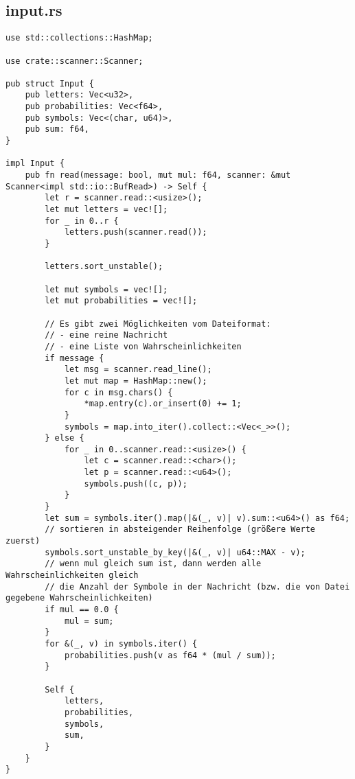 \subsection{input.rs}
\begin{lstlisting}
use std::collections::HashMap;

use crate::scanner::Scanner;

pub struct Input {
    pub letters: Vec<u32>,
    pub probabilities: Vec<f64>,
    pub symbols: Vec<(char, u64)>,
    pub sum: f64,
}

impl Input {
    pub fn read(message: bool, mut mul: f64, scanner: &mut Scanner<impl std::io::BufRead>) -> Self {
        let r = scanner.read::<usize>();
        let mut letters = vec![];
        for _ in 0..r {
            letters.push(scanner.read());
        }

        letters.sort_unstable();

        let mut symbols = vec![];
        let mut probabilities = vec![];

        // Es gibt zwei Möglichkeiten vom Dateiformat:
        // - eine reine Nachricht
        // - eine Liste von Wahrscheinlichkeiten
        if message {
            let msg = scanner.read_line();
            let mut map = HashMap::new();
            for c in msg.chars() {
                *map.entry(c).or_insert(0) += 1;
            }
            symbols = map.into_iter().collect::<Vec<_>>();
        } else {
            for _ in 0..scanner.read::<usize>() {
                let c = scanner.read::<char>();
                let p = scanner.read::<u64>();
                symbols.push((c, p));
            }
        }
        let sum = symbols.iter().map(|&(_, v)| v).sum::<u64>() as f64;
        // sortieren in absteigender Reihenfolge (größere Werte zuerst)
        symbols.sort_unstable_by_key(|&(_, v)| u64::MAX - v);
        // wenn mul gleich sum ist, dann werden alle Wahrscheinlichkeiten gleich 
        // die Anzahl der Symbole in der Nachricht (bzw. die von Datei gegebene Wahrscheinlichkeiten)
        if mul == 0.0 {
            mul = sum;
        }
        for &(_, v) in symbols.iter() {
            probabilities.push(v as f64 * (mul / sum));
        }

        Self {
            letters,
            probabilities,
            symbols,
            sum,
        }
    }
}
\end{lstlisting}
